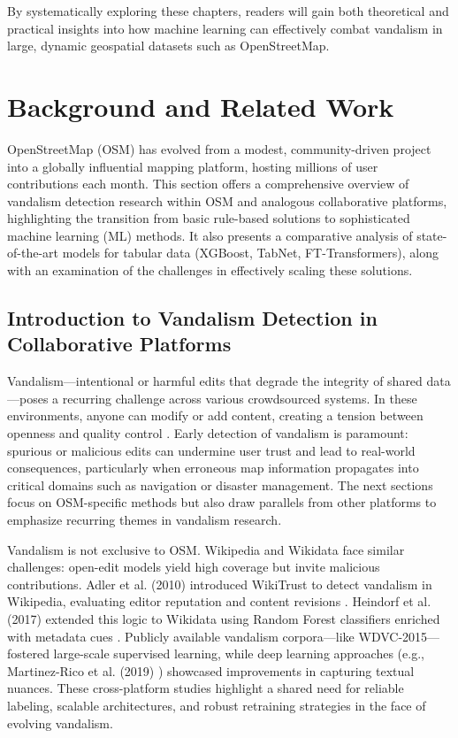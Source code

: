 \documentclass[
    13pt, %
    a4paper, %
    DIV14, %
    listof=totoc, %
    bibliography=totoc, %
    index=totoc, %
    headsepline
]{scrreprt}
\begin{document}
By systematically exploring these chapters, readers will gain both theoretical and practical insights into how machine learning can effectively combat vandalism in large, dynamic geospatial datasets such as OpenStreetMap.


\chapter{Background and Related Work}\label{background}

OpenStreetMap (OSM) has evolved from a modest, community-driven project into a globally influential mapping platform, hosting millions of user contributions each month. This section offers a comprehensive overview of vandalism detection research within OSM and analogous collaborative platforms, highlighting the transition from basic rule-based solutions to sophisticated machine learning (ML) methods. It also presents a comparative analysis of state-of-the-art models for tabular data (XGBoost, TabNet, FT-Transformers), along with an examination of the challenges in effectively scaling these solutions.

\section{Introduction to Vandalism Detection in Collaborative Platforms}

Vandalism—intentional or harmful edits that degrade the integrity of shared data—poses a recurring challenge across various crowdsourced systems. In these environments, anyone can modify or add content, creating a tension between openness and quality control \cite{Adler2010, Heindorf2017, MartinezRico2019}. Early detection of vandalism is paramount: spurious or malicious edits can undermine user trust and lead to real-world consequences, particularly when erroneous map information propagates into critical domains such as navigation or disaster management. The next sections focus on OSM-specific methods but also draw parallels from other platforms to emphasize recurring themes in vandalism research.

Vandalism is not exclusive to OSM. Wikipedia and Wikidata face similar challenges: open-edit models yield high coverage but invite malicious contributions. Adler et al. (2010) introduced WikiTrust to detect vandalism in Wikipedia, evaluating editor reputation and content revisions \cite{Adler2010}. Heindorf et al. (2017) extended this logic to Wikidata using Random Forest classifiers enriched with metadata cues \cite{Heindorf2017}. Publicly available vandalism corpora—like WDVC-2015—fostered large-scale supervised learning, while deep learning approaches (e.g., Martinez-Rico et al. (2019) \cite{MartinezRico2019}) showcased improvements in capturing textual nuances. These cross-platform studies highlight a shared need for reliable labeling, scalable architectures, and robust retraining strategies in the face of evolving vandalism.
\end{document}
